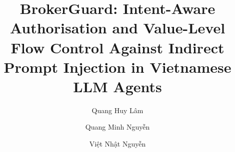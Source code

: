 \documentclass[runningheads]{llncs}
\begin{document}
\title{BrokerGuard: Intent-Aware Authorisation and Value-Level Flow Control Against Indirect Prompt Injection in
Vietnamese LLM Agents}

\author{Quang Huy Lâm \and Quang Minh Nguyễn \and Việt Nhật Nguyễn}

\maketitle
















\end{document}

